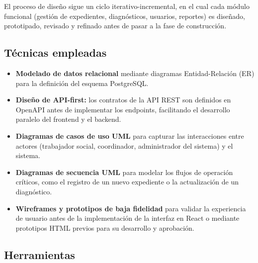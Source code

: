 El proceso de diseño sigue un ciclo iterativo-incremental, en el cual cada módulo
funcional (gestión de expedientes, diagnósticos, usuarios, reportes) es diseñado,
prototipado, revisado y refinado antes de pasar a la fase de construcción.

\subsection*{Técnicas empleadas}

\begin{itemize}
	\item \textbf{Modelado de datos relacional} mediante diagramas Entidad-Relación (ER)
	para la definición del esquema PostgreSQL.
	\item \textbf{Diseño de API-first:} los contratos de la API REST son definidos en
	OpenAPI antes de implementar los endpoints, facilitando el desarrollo paralelo
	del frontend y el backend.
	\item \textbf{Diagramas de casos de uso UML} para capturar las interacciones entre
	actores (trabajador social, coordinador, administrador del sistema) y el sistema.
	\item \textbf{Diagramas de secuencia UML} para modelar los flujos de operación
	críticos, como el registro de un nuevo expediente o la actualización de un
	diagnóstico.
	\item \textbf{Wireframes y prototipos de baja fidelidad} para validar la experiencia
	de usuario antes de la implementación de la interfaz en React o mediante prototipos
	HTML previos para su desarrollo y aprobación.
\end{itemize}

\subsection*{Herramientas}


